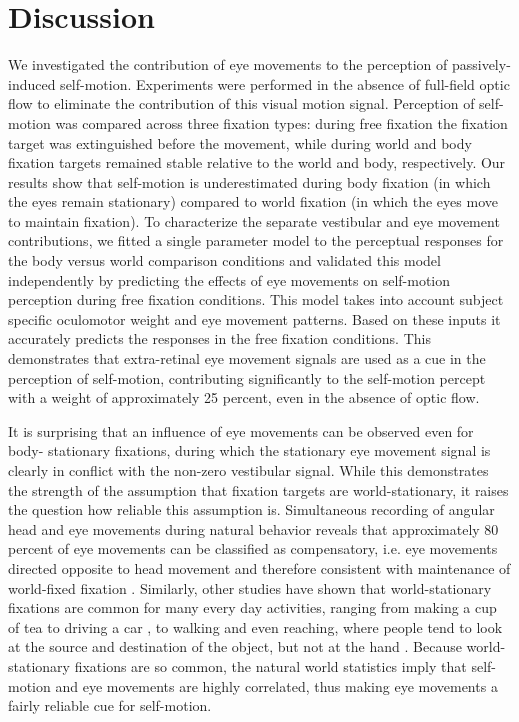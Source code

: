 \section{Discussion}

We investigated the contribution of eye movements to the perception of passively-induced self-motion. Experiments were performed in the absence of full-field optic flow to eliminate the contribution of this visual motion signal. Perception of self-motion was compared across three fixation types: during free fixation the fixation target was extinguished before the movement, while during world and body fixation targets remained stable relative to the world and body, respectively. Our results show that self-motion is underestimated during body fixation (in which the eyes remain stationary) compared to world fixation (in which the eyes move to maintain fixation). To characterize the separate vestibular and eye movement contributions, we fitted a single parameter model to the perceptual responses for the body versus world comparison conditions and validated this model independently by predicting the effects of eye movements on self-motion perception during free fixation conditions. This model takes into account subject specific oculomotor weight and eye movement patterns. Based on these inputs it accurately predicts the responses in the free fixation conditions. This demonstrates that extra-retinal eye movement signals are used as a cue in the perception of self-motion, contributing significantly to the self-motion percept with a weight of approximately 25 percent, even in the absence of optic flow.

It is surprising that an influence of eye movements can be observed even for body- stationary fixations, during which the stationary eye movement signal is clearly in conflict with the non-zero vestibular signal. While this demonstrates the strength of the assumption that fixation targets are world-stationary, it raises the question how reliable this assumption is. Simultaneous recording of angular head and eye movements during natural behavior reveals that approximately 80 percent of eye movements can be classified as compensatory, i.e. eye movements directed opposite to head movement and therefore consistent with maintenance of world-fixed fixation \cite{einhauser2007}. Similarly, other studies have shown that world-stationary fixations are common for many every day activities, ranging from making a cup of tea \cite{hayhoe2014} to driving a car \cite{land1994}, to walking \cite{foulsham2011} and even reaching, where people tend to look at the source and destination of the object, but not at the hand \cite{flanagan2003}. Because world-stationary fixations are so common, the natural world statistics imply that self-motion and eye movements are highly correlated, thus making eye movements a fairly reliable cue for self-motion.


